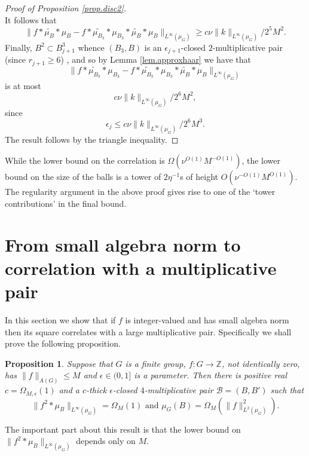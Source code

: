 \documentclass[12pt]{amsart}
\numberwithin{equation}{section}
\theoremstyle{plain}
\newtheorem{proposition}[subsection]{Proposition}
\theoremstyle{definition}
\renewcommand{\leq}{\leqslant}
\renewcommand{\geq}{\geqslant}
\newcommand{\Z}{\mathbb{Z}}
\begin{document}
\begin{proof}[Proof of Proposition \ref{prop.disc2}]
\begin{equation*}
\end{equation*}
It follows that
\begin{equation*}
\| f \ast\widetilde{\mu_{B}} \ast \mu_B - f \ast \widetilde{\mu_{B_3}} \ast \mu_{B_3} \ast \widetilde{\mu_{B}} \ast \mu_B\|_{L^\infty(\mu_G)} \geq c\nu \|k\|_{L^\infty(\mu_G)}/2^5M^2.
\end{equation*}
Finally, $B^2 \subset B_{j+1}^3$ whence $(B_3,B)$ is an $\epsilon_{j+1}$-closed $2$-multiplicative pair (since $r_{j+1} \geq 6$) , and so by Lemma \ref{lem.approxhaar} we have that
\begin{equation*}
\| f \ast\widetilde{\mu_{B_3}} \ast \mu_{B_3} - f \ast \widetilde{\mu_{B_3}} \ast \mu_{B_3} \ast \widetilde{\mu_{B}} \ast \mu_B\|_{L^\infty(\mu_G)}
\end{equation*}
is at most
\begin{equation*}
c\nu \|k\|_{L^\infty(\mu_G)}/2^6M^2,
\end{equation*}
since
\begin{equation*}
\epsilon_j \leq c\nu \|k\|_{L^\infty(\mu_G)}/2^6M^3.
\end{equation*}
The result follows by the triangle inequality.
\end{proof}
While the lower bound on the correlation is $\Omega(\nu^{O(1)}M^{-O(1)})$, the lower bound on the size of the balls is a tower of $2\eta^{-1}$s of height $O(\nu^{-O(1)}M^{O(1)})$.  The regularity argument in the above proof gives rise to one of the `tower contributions' in the final bound.

\section{From small algebra norm to correlation with a multiplicative pair}\label{sec.ank}

In this section we show that if $f$ is integer-valued and has small algebra norm then its square correlates with a large multiplicative pair. Specifically we shall prove the following proposition.
\begin{proposition}\label{prop.correl}
Suppose that $G$ is a finite group, $f:G \rightarrow \Z$, not identically zero, has $\|f\|_{A(G)} \leq M$ and $\epsilon \in (0,1]$ is a parameter.  Then there is positive real $c=\Omega_{M,\epsilon}(1)$ and a $c$-thick $\epsilon$-closed $4$-multiplicative pair $\mathcal{B}=(B,B')$ such that
\begin{equation*}
\|f^2\ast \mu_B\|_{L^\infty(\mu_G)} =\Omega_M(1) \textrm{ and } \mu_G(B)=\Omega_{M}(\|f\|_{L^2(\mu_G)}^2).
\end{equation*}
\end{proposition}
The important part about this result is that the lower bound on $\|f^2\ast\mu_B\|_{L^\infty(\mu_G)}$ depends only on $M$.
\end{document}
